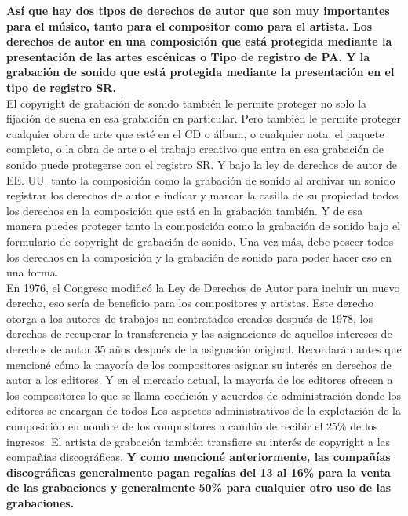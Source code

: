 \documentclass[10pt]{book}
\begin{document}
\textbf{Así que hay dos tipos de derechos de autor que son muy importantes para el músico, tanto para el compositor como para el artista. Los derechos de autor en una composición que está protegida mediante la presentación de las artes escénicas o Tipo de registro de PA. Y la grabación de sonido que está protegida mediante la presentación en el tipo de registro SR.}\\
El copyright de grabación de sonido también le permite proteger no solo la fijación de suena en esa grabación en particular. Pero también le permite proteger cualquier obra de arte que esté en el CD o álbum, o cualquier nota, el paquete completo, o la obra de arte o el trabajo creativo que entra en esa grabación de sonido puede protegerse con el registro SR. Y bajo la ley de derechos de autor de EE. UU. tanto la composición como la grabación de sonido al archivar un sonido registrar los derechos de autor e indicar y marcar la casilla de su propiedad todos los derechos en la composición que está en la grabación también. Y de esa manera puedes proteger tanto la composición como la grabación de sonido bajo el formulario de copyright de grabación de sonido. Una vez más, debe poseer todos los derechos en la composición y la grabación de sonido para poder hacer eso en una forma.\\
En 1976, el Congreso modificó la Ley de Derechos de Autor para incluir un nuevo derecho, eso sería de beneficio para los compositores y artistas. Este derecho otorga a los autores de trabajos no contratados creados después de 1978, los derechos de recuperar la transferencia y las asignaciones de aquellos intereses de derechos de autor 35 años después de la asignación original. Recordarán antes que mencioné cómo la mayoría de los compositores asignar su interés en derechos de autor a los editores. Y en el mercado actual, la mayoría de los editores ofrecen a los compositores lo que se llama coedición y acuerdos de administración donde los editores se encargan de todos Los aspectos administrativos de la explotación de la composición en nombre de los compositores a cambio de recibir el 25\% de los ingresos. El artista de grabación también transfiere su interés de copyright a las compañías discográficas. \textbf{Y como mencioné anteriormente, las compañías discográficas generalmente pagan regalías del 13 al 16\% para la venta de las grabaciones y generalmente 50\% para cualquier otro uso de las grabaciones.} \\
\end{document}
